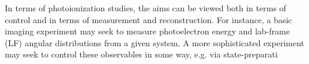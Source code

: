 In terms of photoionization studies, the aims can be viewed both in terms of control and in terms of measurement and reconstruction. For instance, a basic imaging experiment may seek to measure photoelectron energy and lab-frame (LF) angular distributions from a given system. A more sophisticated experiment may seek to control these observables in some way, e.g. via state-preparati